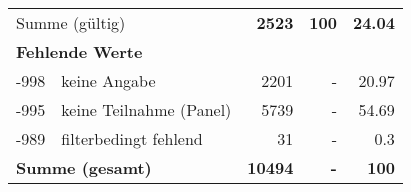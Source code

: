 \begin{longtable}{lXrrr}
     \midrule
     \multicolumn{2}{l}{Summe (gültig)} &
       \textbf{\num{2523}} &
     \textbf{\num{100}} &
       \textbf{\num[round-mode=places,round-precision=2]{24.04}} \\
     \multicolumn{5}{l}{\textbf{Fehlende Werte}}\\
       -998 &
       keine Angabe &
         \num{2201} &
        - &
         \num[round-mode=places,round-precision=2]{20.97} \\
       -995 &
       keine Teilnahme (Panel) &
         \num{5739} &
        - &
         \num[round-mode=places,round-precision=2]{54.69} \\
       -989 &
       filterbedingt fehlend &
         \num{31} &
        - &
         \num[round-mode=places,round-precision=2]{0.3} \\
     \midrule
     \multicolumn{2}{l}{\textbf{Summe (gesamt)}} &
          \textbf{\num{10494}} &
        \textbf{-} &
        \textbf{\num{100}} \\
     \bottomrule
     \end{longtable}
     
